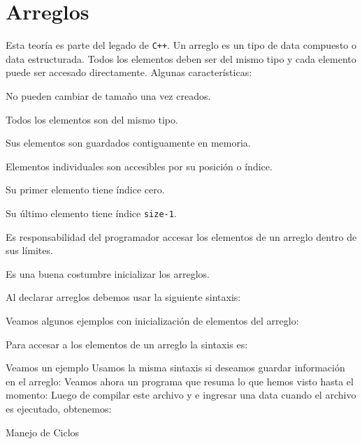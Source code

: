 \chapter{Arreglos}

Esta teoría es parte del legado de \texttt{C++}. Un arreglo es un tipo de data compuesto o data estructurada. Todos los elementos deben ser del mismo tipo y cada elemento puede ser accesado directamente. Algunas características:
\begin{compactitem}
	\item No pueden cambiar de tamaño una vez creados.
	\item Todos los elementos son del mismo tipo.
	\item Sus elementos son guardados contiguamente en memoria.
	\item Elementos individuales son accesibles por su posición o índice.
	\item Su primer elemento tiene índice cero.
	\item Su último elemento tiene índice \texttt{size-1}.
	\item Es responsabilidad del programador accesar los elementos de un arreglo dentro de sus límites.
	\item Es una buena costumbre inicializar los arreglos.
\end{compactitem}

Al declarar arreglos debemos usar la siguiente sintaxis:
\begin{center}
\end{center}

Veamos algunos ejemplos con inicialización de elementos del arreglo:

Para accesar a los elementos de un arreglo la sintaxis es:
\begin{center}
\end{center}
Veamos un ejemplo
Usamos la misma sintaxis si deseamos guardar información en el arreglo:
Veamos ahora un programa que resuma lo que hemos visto hasta el momento:
Luego de compilar este archivo y e ingresar una data cuando el archivo es ejecutado, obtenemos:
\immediate{}
\immediate{}

Manejo de Ciclos
\immediate{}
\immediate{}
\immediate{}
\immediate{}
